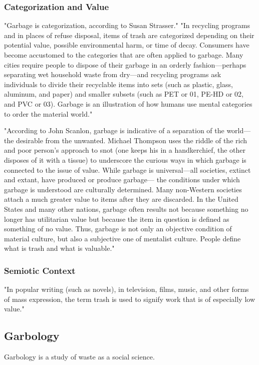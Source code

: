 %
\subsubsection{Categorization and Value}
"Garbage is categorization, according to Susan Strasser." "In recycling programs and in places of refuse disposal, items of trash are categorized depending on their potential value, possible environmental harm, or time of decay. Consumers have become accustomed to the categories that are often applied to garbage. Many cities require people to dispose of their garbage in an orderly fashion---perhaps separating wet household waste from dry---and recycling programs ask individuals to divide their recyclable items into sets (such as plastic, glass, aluminum, and paper) and smaller subsets (such as PET or 01, PE-HD or 02, and PVC or 03). Garbage is an illustration of how humans use mental categories to order the material world." \cite{lukas2012garbage}

"According to John Scanlon, garbage is indicative of a separation of the world---the desirable from the unwanted. Michael Thompson uses the riddle of the rich and poor person’s approach to snot (one keeps his in a handkerchief, the other disposes of it with a tissue) to underscore the curious ways in which garbage is connected to the issue of value. While garbage is universal---all societies, extinct and extant, have produced or produce garbage--- the conditions under which garbage is understood are culturally determined. Many non-Western societies attach a much greater value to items after they are discarded. In the United States and many other nations, garbage often results not because something no longer has utilitarian value but because the item in question is defined as something of no value. Thus, garbage is not only an objective condition of material culture, but also a subjective one of mentalist culture. People define what is trash and what is valuable." \cite{lukas2012garbage}

%
\subsubsection{Semiotic Context}
"In popular writing (such as novels), in television, films, music, and other forms of mass expression, the term trash is used to signify work that is of especially low value." \cite{lukas2012garbage}

\subsection{Garbology}
Garbology is a study of waste as a social science.

